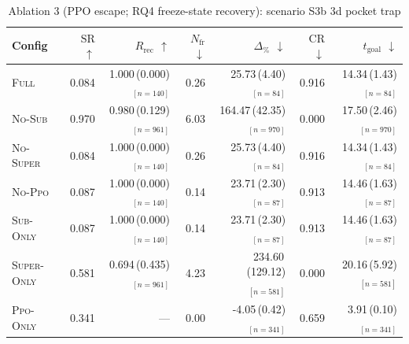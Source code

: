 \begin{table}[h]
\centering
\small
\caption{Ablation 3 (PPO escape; RQ4 freeze-state recovery): scenario S3b 3d pocket trap}
\label{tab:abl3:S3b_3d_pocket_trap}
\begin{tabular}{lrrrrrr}
\toprule
Config & $\mathrm{SR}$ $\uparrow$ & $R_{\mathrm{rec}}$ $\uparrow$ & $N_{\mathrm{fr}}$ $\downarrow$ & $\Delta_{\%}$ $\downarrow$ & $\mathrm{CR}$ $\downarrow$ & $t_{\mathrm{goal}}$ $\downarrow$ \\
\midrule
\textsc{Full} & 0.084 & 1.000\,(0.000)$_{[n=140]}$ & 0.26 & 25.73\,(4.40)$_{[n=84]}$ & 0.916 & 14.34\,(1.43)$_{[n=84]}$ \\
\textsc{No-Sub} & 0.970 & 0.980\,(0.129)$_{[n=961]}$ & 6.03 & 164.47\,(42.35)$_{[n=970]}$ & 0.000 & 17.50\,(2.46)$_{[n=970]}$ \\
\textsc{No-Super} & 0.084 & 1.000\,(0.000)$_{[n=140]}$ & 0.26 & 25.73\,(4.40)$_{[n=84]}$ & 0.916 & 14.34\,(1.43)$_{[n=84]}$ \\
\textsc{No-Ppo} & 0.087 & 1.000\,(0.000)$_{[n=140]}$ & 0.14 & 23.71\,(2.30)$_{[n=87]}$ & 0.913 & 14.46\,(1.63)$_{[n=87]}$ \\
\textsc{Sub-Only} & 0.087 & 1.000\,(0.000)$_{[n=140]}$ & 0.14 & 23.71\,(2.30)$_{[n=87]}$ & 0.913 & 14.46\,(1.63)$_{[n=87]}$ \\
\textsc{Super-Only} & 0.581 & 0.694\,(0.435)$_{[n=961]}$ & 4.23 & 234.60\,(129.12)$_{[n=581]}$ & 0.000 & 20.16\,(5.92)$_{[n=581]}$ \\
\textsc{Ppo-Only} & 0.341 & --- & 0.00 & -4.05\,(0.42)$_{[n=341]}$ & 0.659 & 3.91\,(0.10)$_{[n=341]}$ \\
\bottomrule
\end{tabular}
\end{table}

